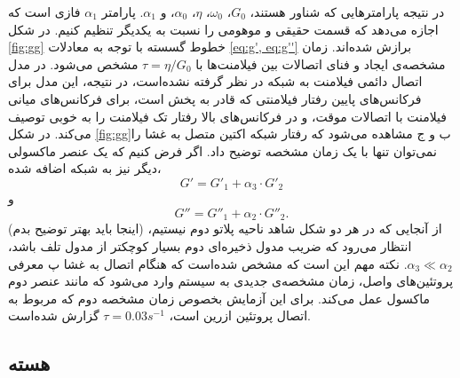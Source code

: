 در نتیجه پارامتر‌هایی که شناور هستند، $G_0$، $\omega_0$، $\eta$، $\alpha_0$، و $\alpha_1$. پارامتر $\alpha_1$ فازی است که اجازه می‌دهد که قسمت حقیقی و موهومی را نسبت به یکدیگر تنظیم کنیم. در شکل \ref{fig:gg} خطوط گسسته با توجه به معادلات \ref{eq:g', eq:g''} برازش شده‌اند. زمان مشخصه‌ی ایجاد و فنای اتصالات بین فیلامنت‌ها با $\tau=\eta/G_0$ مشخص می‌شود. در مدل اتصال دائمی‌ فیلامنت به شبکه در نظر گرفته نشده‌است، در نتیجه، این مدل برای فرکانس‌های پایین رفتار فیلامنتی که قادر به پخش است، برای فرکانس‌های میانی فیلامنت با اتصالات موقت، و در فرکانس‌های بالا رفتار تک فیلامنت را به خوبی توصیف می‌کند. در شکل \ref{fig:gg}ب و ج مشاهده می‌شود که رفتار شبکه اکتین متصل به غشا را نمی‌توان تنها با یک زمان مشخصه توضیح داد. اگر فرض کنیم که یک عنصر ماکسولی دیگر نیز به شبکه اضافه شده،
\begin{equation}
G'=G'_1+\alpha_3\cdot G'_2
\label{eq:g'2}
\end{equation}
و
\begin{equation}
G''=G''_1+\alpha_2\cdot G''_2.
\label{eq:g''2}
\end{equation}
(اینجا باید بهتر توضیح بدم) از آنجایی که در هر دو شکل شاهد ناحیه پلاتو دوم نیستیم، انتظار می‌رود که ضریب مدول ذخیره‌ای دوم بسیار کوچکتر از مدول تلف باشد، $\alpha_3\ll\alpha_2$. نکته مهم این است که مشخص شده‌است که هنگام اتصال به غشا پ معرفی پروتئین‌های واصل، زمان مشخصه‌ی جدیدی به سیستم وارد می‌شود که مانند عنصر دوم ماکسول عمل می‌کند. برای این آزمایش بخصوص زمان مشخصه دوم که مربوط به اتصال پروتئین ازرین است، $\tau=0.03 s^{-1}$ گزارش شده‌است. \cite{doi:10.1021/acs.jpcb.7b11491}

\subsection{هسته}\label{lab:nucleus}

